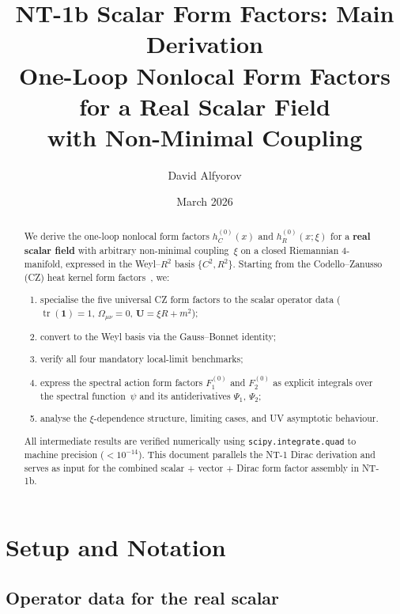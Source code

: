 \documentclass[11pt,a4paper]{article}
\title{%
  \textbf{NT-1b Scalar Form Factors: Main Derivation}\\[6pt]
  \large One-Loop Nonlocal Form Factors for a Real Scalar Field\\
  with Non-Minimal Coupling
}
\author{David Alfyorov}
\date{March 2026}
\newcommand{\Id}{\mathbf{1}}
\newcommand{\tr}{\operatorname{tr}}
\theoremstyle{definition}
\theoremstyle{remark}
\begin{document}
\maketitle

\begin{center}
\end{center}

\thispagestyle{empty}

\begin{abstract}
We derive the one-loop nonlocal form factors $h_C^{(0)}(x)$ and
$h_R^{(0)}(x;\xi)$ for a \textbf{real scalar field} with arbitrary
non-minimal coupling~$\xi$ on a closed Riemannian 4-manifold,
expressed in the Weyl--$R^2$ basis $\{C^2, R^2\}$.
Starting from the Codello--Zanusso (CZ) heat kernel form
factors~\cite{CZ2012}, we:
\begin{enumerate}[nosep]
\item specialise the five universal CZ form factors to the scalar
  operator data ($\tr(\Id)=1$, $\Omega_{\mu\nu}=0$,
  $\mathbf{U}=\xi R + m^2$);
\item convert to the Weyl basis via the Gauss--Bonnet identity;
\item verify all four mandatory local-limit benchmarks;
\item express the spectral action form factors $F_1^{(0)}$ and
  $F_2^{(0)}$ as explicit integrals over the spectral function~$\psi$
  and its antiderivatives $\Psi_1$, $\Psi_2$;
\item analyse the $\xi$-dependence structure, limiting cases,
  and UV asymptotic behaviour.
\end{enumerate}
All intermediate results are verified numerically using
\texttt{scipy.integrate.quad} to machine precision ($< 10^{-14}$).
This document parallels the NT-1 Dirac derivation and serves as
input for the combined scalar + vector + Dirac form factor
assembly in NT-1b.
\end{abstract}

\tableofcontents
\newpage


\section{Setup and Notation}
\label{sec:setup}

\subsection{Operator data for the real scalar}
\end{document}
